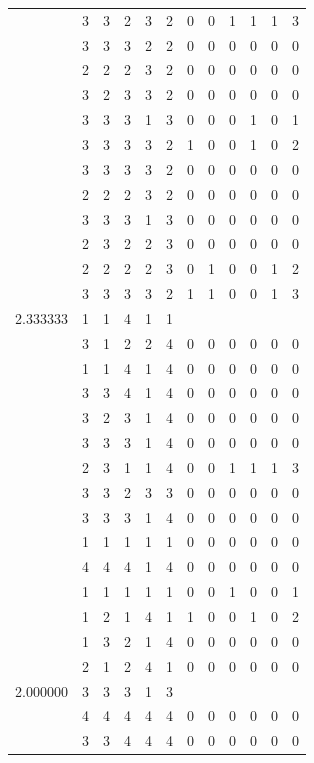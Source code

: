 \documentclass[]{book}
\theoremstyle{definition}
\theoremstyle{definition}
\theoremstyle{definition}
\theoremstyle{remark}
\begin{document}
\begin{table}
{\begin{tabular}[t]{rrrrrrrrrrrr}
 & 3 & 3 & 2 & 3 & 2 & 0 & 0 & 1 & 1 & 1 & 3\\
 & 3 & 3 & 3 & 2 & 2 & 0 & 0 & 0 & 0 & 0 & 0\\
 & 2 & 2 & 2 & 3 & 2 & 0 & 0 & 0 & 0 & 0 & 0\\
 & 3 & 2 & 3 & 3 & 2 & 0 & 0 & 0 & 0 & 0 & 0\\
 & 3 & 3 & 3 & 1 & 3 & 0 & 0 & 0 & 1 & 0 & 1\\
 & 3 & 3 & 3 & 3 & 2 & 1 & 0 & 0 & 1 & 0 & 2\\
 & 3 & 3 & 3 & 3 & 2 & 0 & 0 & 0 & 0 & 0 & 0\\
 & 2 & 2 & 2 & 3 & 2 & 0 & 0 & 0 & 0 & 0 & 0\\
 & 3 & 3 & 3 & 1 & 3 & 0 & 0 & 0 & 0 & 0 & 0\\
 & 2 & 3 & 2 & 2 & 3 & 0 & 0 & 0 & 0 & 0 & 0\\
 & 2 & 2 & 2 & 2 & 3 & 0 & 1 & 0 & 0 & 1 & 2\\
 & 3 & 3 & 3 & 3 & 2 & 1 & 1 & 0 & 0 & 1 & 3\\
2.333333 & 1 & 1 & 4 & 1 & 1 &  &  &  &  &  & \\
 & 3 & 1 & 2 & 2 & 4 & 0 & 0 & 0 & 0 & 0 & 0\\
 & 1 & 1 & 4 & 1 & 4 & 0 & 0 & 0 & 0 & 0 & 0\\
 & 3 & 3 & 4 & 1 & 4 & 0 & 0 & 0 & 0 & 0 & 0\\
 & 3 & 2 & 3 & 1 & 4 & 0 & 0 & 0 & 0 & 0 & 0\\
 & 3 & 3 & 3 & 1 & 4 & 0 & 0 & 0 & 0 & 0 & 0\\
 & 2 & 3 & 1 & 1 & 4 & 0 & 0 & 1 & 1 & 1 & 3\\
 & 3 & 3 & 2 & 3 & 3 & 0 & 0 & 0 & 0 & 0 & 0\\
 & 3 & 3 & 3 & 1 & 4 & 0 & 0 & 0 & 0 & 0 & 0\\
 & 1 & 1 & 1 & 1 & 1 & 0 & 0 & 0 & 0 & 0 & 0\\
 & 4 & 4 & 4 & 1 & 4 & 0 & 0 & 0 & 0 & 0 & 0\\
 & 1 & 1 & 1 & 1 & 1 & 0 & 0 & 1 & 0 & 0 & 1\\
 & 1 & 2 & 1 & 4 & 1 & 1 & 0 & 0 & 1 & 0 & 2\\
 & 1 & 3 & 2 & 1 & 4 & 0 & 0 & 0 & 0 & 0 & 0\\
 & 2 & 1 & 2 & 4 & 1 & 0 & 0 & 0 & 0 & 0 & 0\\
2.000000 & 3 & 3 & 3 & 1 & 3 &  &  &  &  &  & \\
 & 4 & 4 & 4 & 4 & 4 & 0 & 0 & 0 & 0 & 0 & 0\\
 & 3 & 3 & 4 & 4 & 4 & 0 & 0 & 0 & 0 & 0 & 0\\

\end{tabular}}
\end{table}
\end{document}
